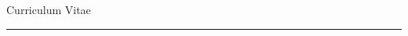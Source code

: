 \documentclass[10pt]{article}
\begin{document}
\begin{cv}{Curriculum Vitae}
\hrule

\medskip





%



\end{cv}
\end{document}
